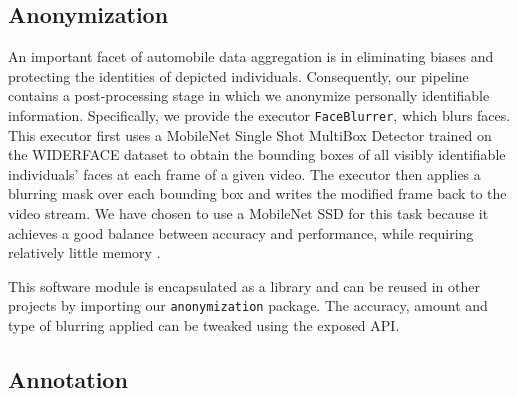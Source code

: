 \documentclass[letterpaper, 10 pt, conference]{ieeeconf}
\newcommand{\todo}[1]{{\color{red}#1}}
\begin{document}
\subsection{Anonymization}
An important facet of automobile data aggregation is in eliminating biases and protecting the identities of depicted individuals. Consequently, our pipeline contains a post-processing stage in which we anonymize personally identifiable information. Specifically, we provide the executor \texttt{FaceBlurrer}, which blurs faces. This executor first uses a MobileNet Single Shot MultiBox Detector \cite{yixuan_h_y_hu_2021_4642275} trained on the WIDERFACE dataset \cite{yang2016wider} to obtain the bounding boxes of all visibly identifiable individuals' faces at each frame of a given video. The executor then applies a blurring mask over each bounding box and writes the modified frame back to the video stream. We have chosen to use a MobileNet SSD for this task because it achieves a good balance between accuracy and performance, while requiring relatively little memory \cite{yixuan_h_y_hu_2021_4642275}.

This software module is encapsulated as a library and can be reused in other projects by importing our \texttt{anonymization} package. The accuracy, amount and type of blurring applied can be tweaked using the exposed API.

\subsection{Annotation}

\end{document}

